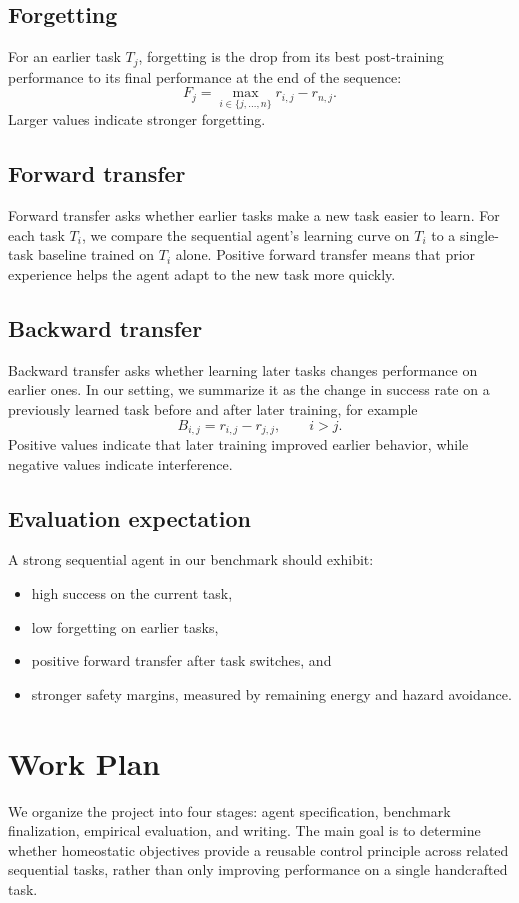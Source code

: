 \documentclass[sigplan,10pt]{acmart}
\begin{document}
\subsection{Forgetting}
For an earlier task $T_j$, forgetting is the drop from its best
post-training performance to its final performance at the end of the
sequence:
\[
F_j = \max_{i \in \{j, \ldots, n\}} r_{i,j} - r_{n,j}.
\]
Larger values indicate stronger forgetting.
\subsection{Forward transfer} 
Forward transfer asks whether earlier tasks make a new task easier to
learn. For each task $T_i$, we compare the sequential agent's learning
curve on $T_i$ to a single-task baseline trained on $T_i$ alone.
Positive forward transfer means that prior experience helps the agent
adapt to the new task more quickly.
\subsection{Backward transfer}
Backward transfer asks whether learning later tasks changes performance
on earlier ones. In our setting, we summarize it as the change in
success rate on a previously learned task before and after later
training, for example
\[
B_{i,j} = r_{i,j} - r_{j,j}, \qquad i > j.
\]
Positive values indicate that later training improved earlier behavior,
while negative values indicate interference.
\subsection{Evaluation expectation}
A strong sequential agent in our benchmark should exhibit:
\begin{itemize}
    \item high success on the current task,
    \item low forgetting on earlier tasks,
    \item positive forward transfer after task switches, and
    \item stronger safety margins, measured by remaining energy and hazard avoidance.
\end{itemize}

\section{Work Plan}

We organize the project into four stages: agent specification, benchmark finalization, empirical evaluation, and writing. The main goal is to determine whether homeostatic objectives provide a reusable control principle across related sequential tasks, rather than only improving performance on a single handcrafted task.
\end{document}
